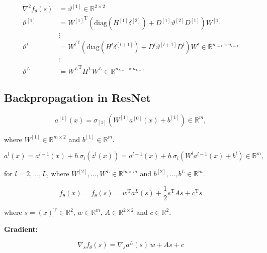 \begin{align*}
    \nabla^{2} f_{\theta}(s) & = \vartheta^{[1]} \in \mathbb{R}^{2 \times 2} \\
    \vartheta^{[1]} & = {W^{[1]}}^{\mathrm{T}} \left( \mathrm{diag}(H^{[1]} \delta^{[2]}) + D^{[1]} \vartheta^{[2]} D^{[1]} \right) W^{[1]} \\
    & \vdots \\
    \vartheta^{l} & = {W^{l}}^{\mathrm{T}} \left( \mathrm{diag}(H^{l} \delta^{[l+1]}) + D^{l} \vartheta^{[l+1]} D^{l} \right) W^{l} \in \mathbb{R}^{n_{l-1} \times n_{l-1}} \\
    & \vdots \\
    \vartheta^{L} & = {W^{L}}^{\mathrm{T}} H^{L} W^{L} \in \mathbb{R}^{n_{L-1} \times n_{L-1}}
\end{align*}






\subsection{Backpropagation in ResNet}

\begin{equation*}
    a^{[1]}(x) = \sigma_{[1]} (W^{[1]} a^{[0]}(x) + b^{[1]}) \in \mathbb{R}^{m}, 
\end{equation*}

where $W^{[1]} \in \mathbb{R}^{m \times 2}$ and $b^{[1]} \in \mathbb{R}^{m}$.

\begin{equation*}
    a^{l}(x) = a^{l-1}(x) + h \, \sigma_{l} (z^{l}(x)) = a^{l-1}(x) + h \, \sigma_{l} (W^{l} a^{l-1}(x) + b^{l}) \in \mathbb{R}^{m}, 
\end{equation*}

for $l = 2, \ldots, L$, where $W^{[2]}, \ldots, W^{L} \in \mathbb{R}^{m \times m}$ and $b^{[2]}, \ldots, b^{L} \in \mathbb{R}^{m}$.

\begin{equation*}
    f_{\theta}(x) = f_{\theta}(s) = w^{\mathrm{T}} a^{L}(s) + \frac{1}{2} s^{\mathrm{T}} A s + c^{\mathrm{T}} s 
\end{equation*}

where $s = (x)^{\mathrm{T}} \in \mathbb{R}^{2}$, $w \in \mathbb{R}^{m}$, $A \in \mathbb{R}^{2 \times 2}$ and $c \in \mathbb{R}^2$.

\textbf{Gradient:}

\begin{equation*}
    \nabla_s f_{\theta}(s) = \nabla_s a^{L}(s) \, w + A s + c
\end{equation*}

